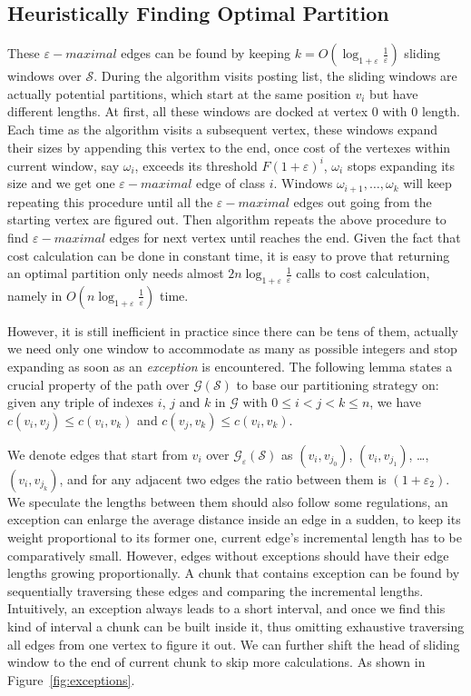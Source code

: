\documentclass[runningheads,a4paper]{llncs}
\begin{document}
\subsection{Heuristically Finding Optimal Partition}
These $\varepsilon-maximal$ edges can be found by keeping $k = O\left(\log_{1+\varepsilon}\frac{1}{\varepsilon}\right)$ sliding windows over $\mathcal{S}$.
During the algorithm visits posting list, the sliding windows are actually potential partitions, which start at the same position $ v_{i} $ but have different lengths.
At first, all these windows are docked at vertex 0 with 0 length.
Each time as the algorithm visits a subsequent vertex, these windows expand their sizes by appending this vertex to the end, once cost of the vertexes within current window, say $ \omega_{i} $, exceeds its threshold $ F \left( 1 + \varepsilon \right) ^{i} $, $ \omega_{i} $ stops expanding its size and we get one $\varepsilon-maximal$ edge of class $ i $.
Windows $ \omega_{i+1}, \dots, \omega_{k}$ will keep repeating this procedure until all the $\varepsilon-maximal$ edges out going from the starting vertex are figured out.
Then algorithm repeats the above procedure to find $\varepsilon-maximal$ edges for next vertex until reaches the end.
Given the fact that cost calculation can be done in constant time, it is easy to prove that returning an optimal partition only needs almost $ 2n\log_{1+\varepsilon}\frac{1}{\varepsilon} $ calls to cost calculation, namely in $O\left(n\log_{1+\varepsilon}\frac{1}{\varepsilon}\right)$ time.

However, it is still inefficient in practice since there can be tens of them, actually we need only one window to accommodate as many as possible integers and stop expanding as soon as an \textit{exception} is encountered.
The following lemma states a crucial property of the path over $\mathcal{G}\left(\mathcal{S}\right)$ to base our partitioning strategy on:	given any triple of indexes $i$, $j$ and $k$ in $\mathcal{G}$ with $0\leqslant i<j<k\leqslant n$, we have $c(v_{i},v_{j})\leqslant c(v_{i},v_{k})$ and $c(v_{j},v_{k})\leqslant c(v_{i},v_{k})$.

We denote edges that start from $v_{i}$ over $\mathcal{G}_{\varepsilon}\left(\mathcal{S}\right)$ as $(v_{i},v_{j_{0}})$, $(v_{i},v_{j_{1}})$, \ldots, $(v_{i},v_{j_{k}})$, and for any adjacent two edges the ratio between them is $(1+\varepsilon_{2})$.
We speculate the lengths between them should also follow some regulations, an exception can enlarge the average distance inside an edge in a sudden, to keep its weight proportional to its former one, current edge's incremental length has to be comparatively small.
However, edges without exceptions should have their edge lengths growing proportionally.
A chunk that contains exception can be found by sequentially traversing these edges and comparing the incremental lengths.
Intuitively, an exception always leads to a short interval, and once we find this kind of interval a chunk can be built inside it, thus omitting exhaustive traversing all edges from one vertex to figure it out.
We can further shift the head of sliding window to the end of current chunk to skip more calculations.
As shown in Figure~\ref{fig:exceptions}.
\end{document}
